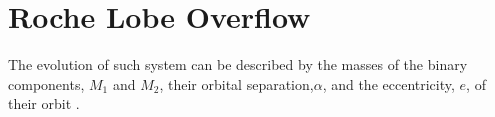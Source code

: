 
\section{Roche Lobe Overflow}

The evolution of such system can be described by the masses of the binary components, $M_1$ and $M_2$, their orbital separation,$\alpha$, and the eccentricity, $e$, of their orbit \citep{postnov2014evolution,sana2012binary,toonen2014popcorn}.

